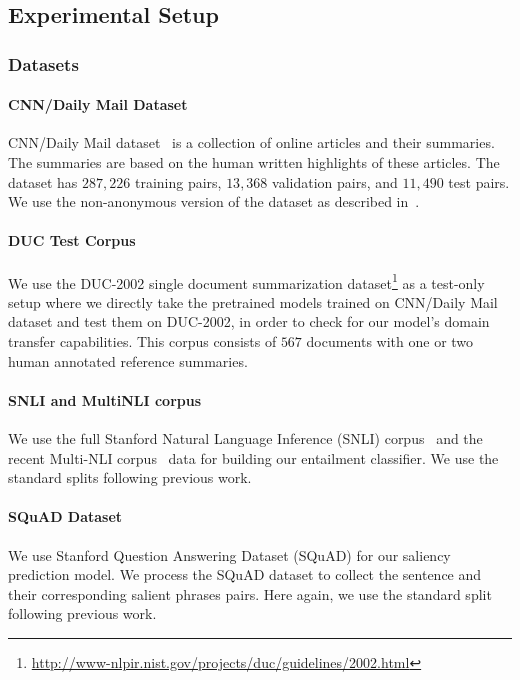 \documentclass[11pt,a4paper]{article}
\begin{document}
\subsection{Experimental Setup}
\label{suppl:sec-setup}

\subsubsection{Datasets}
\label{subsec:suppl:datasets}

\paragraph{CNN/Daily Mail Dataset}
CNN/Daily Mail dataset~\cite{hermann2015teaching,nallapati2016abstractive} is a collection of online articles and their summaries. The summaries are based on the human written highlights of these articles. The dataset has $287,226$ training pairs, $13,368$ validation pairs, and $11,490$ test pairs. We use the non-anonymous version of the dataset as described in~.
 
\paragraph{DUC Test Corpus}
We use the DUC-2002 single document summarization dataset\footnote{\scriptsize{\url{http://www-nlpir.nist.gov/projects/duc/guidelines/2002.html}}} as a test-only setup where we directly take the pretrained models trained on CNN/Daily Mail dataset and test them on DUC-2002, in order to check for our model's domain transfer capabilities. This corpus consists of $567$ documents with one or two human annotated reference summaries.


\paragraph{SNLI and MultiNLI corpus}
We use the full Stanford Natural Language Inference (SNLI) corpus~\cite{bowman2015large} and the recent Multi-NLI corpus~\cite{williams2017broad} data for building our entailment classifier. We use the standard splits following previous work.

\paragraph{SQuAD Dataset}
We use Stanford Question Answering Dataset (SQuAD) for our saliency prediction model. We process the SQuAD dataset to collect the sentence and their corresponding salient phrases pairs. Here again, we use the standard split following previous work.
\end{document}
